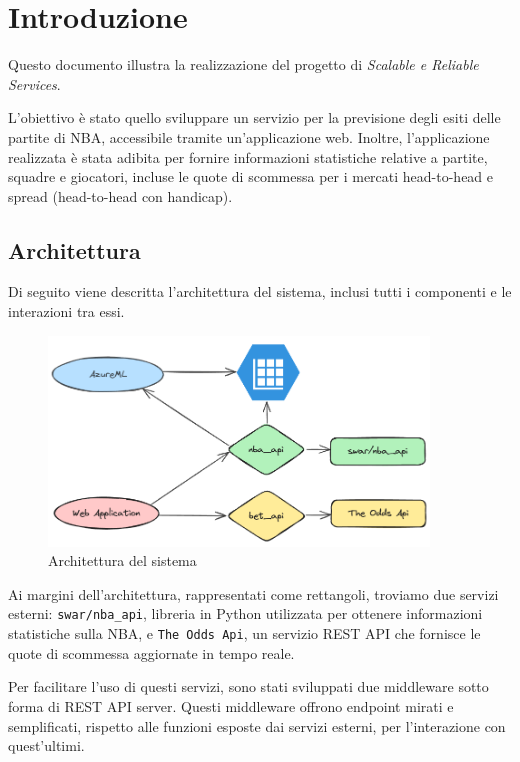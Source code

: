 \section{Introduzione}

Questo documento illustra la realizzazione del progetto di \textit{Scalable e Reliable Services}.

L'obiettivo è stato quello sviluppare un servizio per la previsione degli esiti delle partite di NBA, accessibile tramite un'applicazione web. Inoltre, l'applicazione realizzata è stata adibita per fornire informazioni statistiche relative a partite, squadre e giocatori, incluse le quote di scommessa per i mercati head-to-head e spread (head-to-head con handicap).

\subsection{Architettura}

Di seguito viene descritta l'architettura del sistema, inclusi tutti i componenti e le interazioni tra essi.

\begin{figure}[H]
\centering
\includegraphics[width=0.9\textwidth]{img/architecture.png}
\caption{Architettura del sistema}
\end{figure}

Ai margini dell'architettura, rappresentati come rettangoli, troviamo due servizi esterni: \texttt{swar/nba\_api}, libreria in Python utilizzata per ottenere informazioni statistiche sulla NBA, e \texttt{The Odds Api}, un servizio REST API che fornisce le quote di scommessa aggiornate in tempo reale.

Per facilitare l'uso di questi servizi, sono stati sviluppati due middleware sotto forma di REST API server. Questi middleware offrono endpoint mirati e semplificati, rispetto alle funzioni esposte dai servizi esterni, per l'interazione con quest'ultimi.

